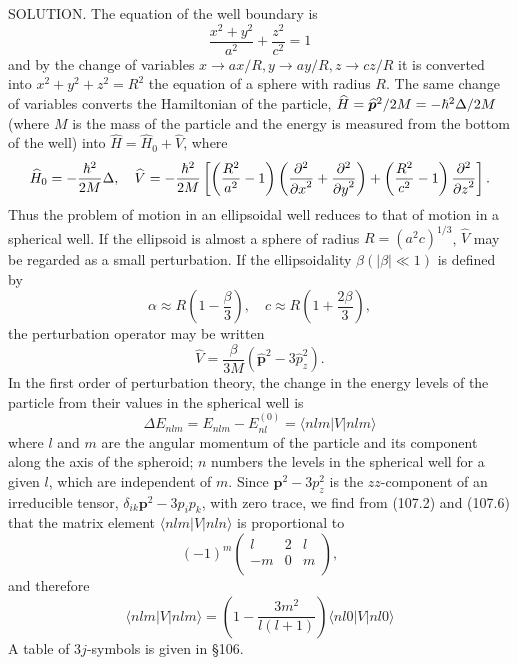 {SOLUTION. The equation of the well boundary is
\[ \frac{x^2+y^2}{a^2}+\frac{z^2}{c^2}=1 \]
and by the change of variables $ x \to ax/R, y \to ay/R, z \to cz/R $ it is converted into $ x^2+y^2+z^2 = R^2 $ the equation of a sphere with radius $ R $. The same change of variables converts the Hamiltonian of the particle, $ \widehat{H}=\widehat{\bm{p}}^2/2M=-\hbar^2\Delta/2M $ (where $ M $ is the mass of the particle and the energy is measured from the bottom of the well) into $ \hat{H}=\hat{H}_0+\hat{V} $, where
\[ \widehat{H}_0=-\frac{\hbar^2}{2M}\Delta,\quad\widehat{V}=-\frac{\hbar^2}{2M}\left[\left(\frac{R^2}{a^2}-1 \right)\left(\frac{\partial^2}{{\partial x}^2}+\frac{\partial^2}{{\partial y}^2} \right)+\left(\frac{R^2}{c^2}-1 \right)\frac{\partial^2}{{\partial z}^2} \right]. \]
Thus the problem of motion in an ellipsoidal well reduces to that of motion in a spherical well. If the ellipsoid is almost a sphere of radius $ R = (a^2c)^{1/3} $, $ \hat{V} $ may be regarded as a small perturbation. If the ellipsoidality $ \beta (|\beta|\ll1) $ is defined by
\[ \alpha\approx R\left(1-\frac{\beta}{3} \right),\quad c\approx R\left(1+\frac{2\beta}{3} \right), \]
the perturbation operator may be written
\[ \hat{V}=\frac{\beta}{3M}(\hat{\bm{p}}^2-3\hat{p}_z^2). \]
In the first order of perturbation theory, the change in the energy levels of the particle from their values in the spherical well is
\[ \Delta E_{nlm}=E_{nlm}-E_{nl}^{(0)}=\langle nlm|V|nlm\rangle \]
where $ l $ and $ m $ are the angular momentum of the particle and its component along the axis of the spheroid; $ n $ numbers the levels in the spherical well for a given $ l $, which are independent of $ m $. Since $ \bm{p}^2-3p_z^2 $ is the $ zz $-component of an irreducible tensor, $ \delta_{ik}\bm{p}^2-3p_ip_k $, with zero trace, we find from (107.2) and (107.6) that the matrix element $ \langle nlm|V|nln\rangle $ is proportional to
\[ (-1)^m\left( \begin{array}{ccc}
l&2&l\\
-m&0&m\\
\end{array} \right), \]
and therefore
\[ \langle nlm|V|nlm\rangle=\left(1-\frac{3m^2}{l(l+1)} \right)\langle nl0|V|nl0\rangle \]
A table of $ 3j $-symbols is given in \S106.

}

